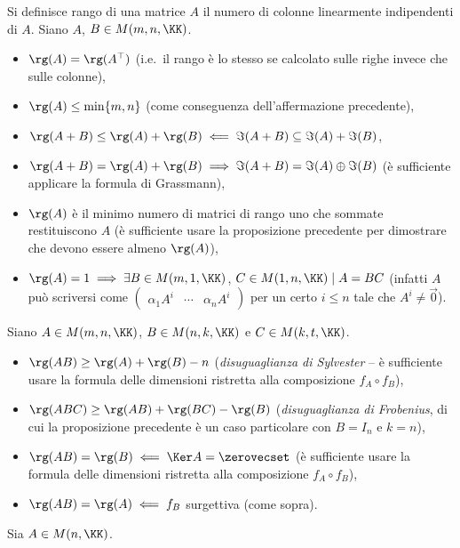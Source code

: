 \documentclass[10pt,landscape]{article}
\begin{document}
\begin{multicols}{3}
		Si definisce rango di una matrice $A$ il numero di colonne linearmente
		indipendenti di $A$. Siano $A$, $B \in M(m, n, \KK)$.
		
		\begin{itemize}
			\item $\rg(A) = \rg(A^\top)$ (i.e.~il rango è lo stesso se calcolato
			sulle righe invece che sulle colonne),
			\item $\rg(A) \leq \min\{m, n\}$ (come conseguenza dell'affermazione
			precedente),
			\item $\rg(A+B) \leq \rg(A) + \rg(B) \impliedby \Im (A+B) \subseteq
			\Im(A) + \Im(B)$,
			\item $\rg(A+B) = \rg(A) + \rg(B) \implies \Im(A+B) = \Im(A) \oplus \Im(B)$ (è sufficiente applicare la formula di Grassmann),
			\item $\rg(A)$ è il minimo numero di matrici di rango uno che
			sommate restituiscono $A$ (è sufficiente usare la proposizione
			precedente per dimostrare che devono essere almeno $\rg(A)$),
			\item $\rg(A)=1 \implies \exists B \in M(m, 1, \KK)$, $C \in M(1, n, \KK) \mid A=BC$ (infatti $A$ può scriversi come $\begin{pmatrix}\alpha_1 A^i & \cdots & \alpha_n A^i \end{pmatrix}$ per un certo $i \leq n$ tale che $A^i \neq \vec{0}$).
		\end{itemize}
		
		Siano $A \in M(m, n, \KK)$, $B \in M(n, k, \KK)$ e $C \in M(k, t, \KK)$.
		
		\begin{itemize}
			\item $\rg(AB) \geq \rg(A) + \rg(B) - n$ (\textit{disuguaglianza
				di Sylvester} -- è sufficiente
			usare la formula delle dimensioni ristretta alla composizione
			$f_A \circ f_B$),
			\item $\rg(ABC) \geq \rg(AB) + \rg(BC) - \rg(B)$ (\textit{disuguaglianza di Frobenius}, di cui la proposizione
			precedente è un caso particolare con $B = I_n$ e $k=n$),
			\item $\rg(AB) = \rg(B) \impliedby \Ker A = \zerovecset$ (è
			sufficiente usare la formula delle dimensioni ristretta
			alla composizione $f_A \circ f_B$),
			\item $\rg(AB) = \rg(A) \impliedby f_B$ surgettiva (come sopra).
		\end{itemize}
		
		Sia $A \in M(n, \KK)$.
		

\end{multicols}
\end{document}
